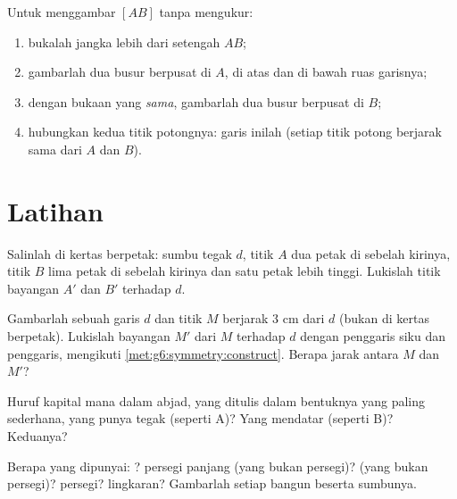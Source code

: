 \begin{method}\label{met:g6:symmetry:bisector}
Untuk menggambar  $[AB]$ tanpa mengukur:
\begin{enumerate}
  \item bukalah jangka lebih dari setengah $AB$;
  \item gambarlah dua busur berpusat di $A$, di atas dan di bawah ruas
        garisnya;
  \item dengan bukaan yang \emph{sama}, gambarlah dua busur berpusat
        di $B$;
  \item hubungkan kedua titik potongnya: garis inilah 
        (setiap titik potong berjarak sama dari $A$ dan $B$).
\end{enumerate}
\end{method}

\section{Latihan}

\begin{exercise}[$\star$]\label{exo:g6:symmetry:1}
Salinlah di kertas berpetak: sumbu tegak $d$, titik $A$ dua petak di
sebelah kirinya, titik $B$ lima petak di sebelah kirinya dan satu
petak lebih tinggi. Lukislah titik bayangan $A'$ dan $B'$ terhadap $d$.
\end{exercise}

\begin{exercise}[$\star$]\label{exo:g6:symmetry:2}
Gambarlah sebuah garis $d$ dan titik $M$ berjarak $3$ cm dari $d$
(bukan di kertas berpetak). Lukislah bayangan $M'$ dari $M$ terhadap
$d$ dengan penggaris siku dan penggaris, mengikuti
\cref{met:g6:symmetry:construct}. Berapa jarak antara $M$ dan $M'$?
\end{exercise}

\begin{exercise}[$\star$]\label{exo:g6:symmetry:3}
Huruf kapital mana dalam abjad, yang ditulis dalam bentuknya yang
paling sederhana, yang punya  tegak (seperti A)? Yang
mendatar (seperti B)? Keduanya?
\end{exercise}

\begin{exercise}[$\star$]\label{exo:g6:symmetry:4}
Berapa  yang dipunyai: ? persegi
panjang (yang bukan persegi)?  (yang bukan persegi)?
persegi? lingkaran? Gambarlah setiap bangun beserta sumbunya.
\end{exercise}

